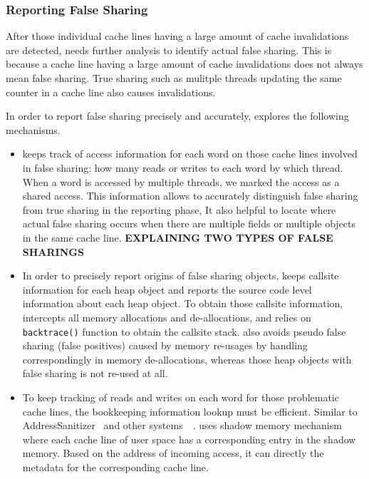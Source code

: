 \subsubsection{Reporting False Sharing}
After those individual cache lines having a large amount of cache
invalidations are detected,
 needs further analysis to identify actual false sharing. 
This is because a cache line having a large amount of cache invalidations does not 
always mean false sharing. 
True sharing such as mulitple threads updating 
the same counter in a cache line also causes invalidations.

In order to report false sharing precisely and accurately, 
\Defaults{} explores the following mechanisms. 
\begin{itemize}
\item
{} keeps track of access information for each word on those
cache lines involved in false sharing: how many reads or writes to each word by which thread. 
When a word is accessed by multiple threads,
we marked the access as a shared access. This information 
allows  to accurately distinguish false sharing from true sharing 
in the reporting phase,  
It also helpful to locate where 
actual false sharing occurs when there are multiple fields or multiple objects in the same cache line. 
\textbf{EXPLAINING TWO TYPES OF FALSE SHARINGS}

\item
In order to precisely report origins of false sharing objects, 
keeps callsite information for each heap object and reports the source code level
information about each heap object. To obtain those callsite information, 
intercepts all memory allocations and de-allocations,  and relies on \texttt{backtrace()} 
function to obtain the callsite stack. 
 also avoids pseudo false sharing (false positives) caused by memory re-usages 
by handling correspondingly in memory de-allocations, whereas those heap objects with false 
sharing is not re-used at all.

\item
To keep tracking of reads and writes on each word for those problematic cache lines,
the bookkeeping information lookup must be efficient.
Similar to 
AddressSanitizer~\cite{Addresssanitizer} and other systems~\cite{qinzhaodetection}~\cite{Valgrind}. 
 uses shadow memory mechanism
where each cache line of user space has a corresponding entry in the shadow memory. 
Based on the address of incoming access, it can directly  
the metadata for the corresponding cache line.



\end{itemize}
